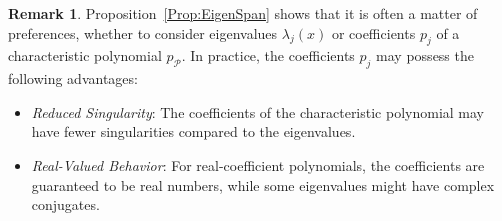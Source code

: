 \documentclass[12pt]{article}
\theoremstyle{definition}
\newtheorem{remark}[lemma]{Remark}
\begin{document}
\begin{remark} Proposition~\ref{Prop:EigenSpan} shows that it is often a matter of preferences, whether to consider eigenvalues $\lambda_j(x)$ or coefficients $p_j$ of a characteristic polynomial $p_{\mathcal{P}}$. In practice, the coefficients $p_j$ may possess the following advantages:

\begin{itemize}

    \item \textit{Reduced Singularity}: The coefficients of the characteristic polynomial may have fewer singularities compared to the eigenvalues.

    \item \textit{Real-Valued Behavior}: For real-coefficient polynomials, the coefficients are guaranteed to be real numbers, while some eigenvalues might have complex conjugates. 
    
\end{itemize}

 \end{remark}
\end{document}
